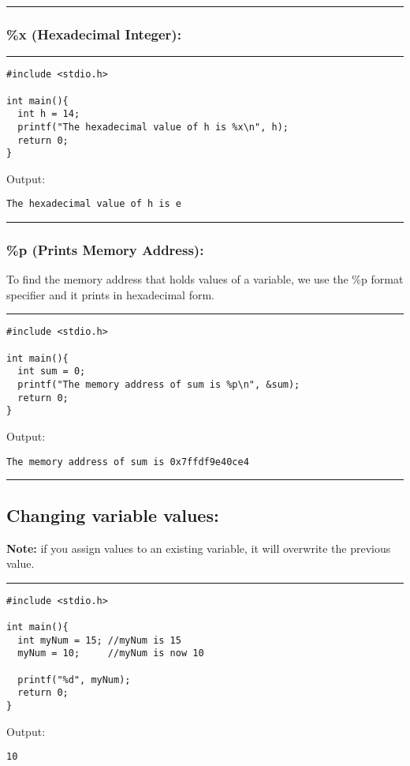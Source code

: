 \documentclass[a4paper]{article}
\begin{document}
\noindent\rule{\textwidth}{0.5pt}

\subsubsection{\%x (Hexadecimal Integer):}
\label{sec:org39c5be4}

\noindent\rule{\textwidth}{0.5pt}
\begin{verbatim}
#include <stdio.h>

int main(){
  int h = 14;
  printf("The hexadecimal value of h is %x\n", h);
  return 0;
}
\end{verbatim}
Output:
\begin{verbatim}
The hexadecimal value of h is e
\end{verbatim}

\noindent\rule{\textwidth}{0.5pt}

\subsubsection{\%p (Prints Memory Address):}
\label{sec:org6fa130f}
To find the memory address that holds values of a variable, we use the \%p format
specifier and it prints in hexadecimal form.

\noindent\rule{\textwidth}{0.5pt}
\begin{verbatim}
#include <stdio.h>

int main(){
  int sum = 0;
  printf("The memory address of sum is %p\n", &sum);
  return 0;
}
\end{verbatim}
Output:
\begin{verbatim}
The memory address of sum is 0x7ffdf9e40ce4
\end{verbatim}

\noindent\rule{\textwidth}{0.5pt}

\subsection{Changing variable values:}
\label{sec:orgcc3b2f9}
\textbf{Note:} if you assign values to an existing variable, it will overwrite the
 previous value.

\noindent\rule{\textwidth}{0.5pt}
\begin{verbatim}
#include <stdio.h>

int main(){
  int myNum = 15; //myNum is 15
  myNum = 10;     //myNum is now 10

  printf("%d", myNum);
  return 0;
}
\end{verbatim}
Output:
\begin{verbatim}
10
\end{verbatim}
\end{document}
